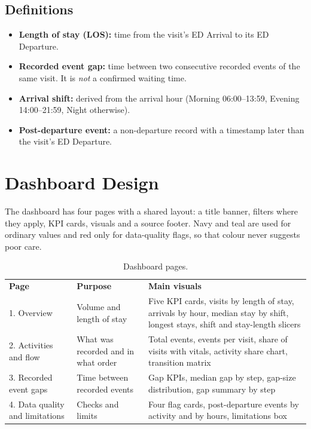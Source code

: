 \documentclass[11pt,a4paper]{article}
\newcommand{\tablehead}[1]{\color{white}\sffamily\bfseries #1}
\begin{document}
\subsection{Definitions}
\begin{itemize}
  \item \textbf{Length of stay (LOS):} time from the visit's ED Arrival to its ED Departure.
  \item \textbf{Recorded event gap:} time between two consecutive recorded events of the same visit. It is \emph{not} a confirmed waiting time.
  \item \textbf{Arrival shift:} derived from the arrival hour (Morning 06:00--13:59, Evening 14:00--21:59, Night otherwise).
  \item \textbf{Post-departure event:} a non-departure record with a timestamp later than the visit's ED Departure.
\end{itemize}

\section{Dashboard Design}
The dashboard has four pages with a shared layout: a title banner, filters where they apply, KPI cards, visuals and a source footer. Navy and teal are used for ordinary values and red only for data-quality flags, so that colour never suggests poor care.

\begin{table}[H]
\centering
\begin{tabularx}{\textwidth}{L{3.5cm}L{4cm}Y}
\tablehead{Page} & \tablehead{Purpose} & \tablehead{Main visuals}\\
1. Overview & Volume and length of stay & Five KPI cards, visits by length of stay, arrivals by hour, median stay by shift, longest stays, shift and stay-length slicers\\
2. Activities and flow & What was recorded and in what order & Total events, events per visit, share of visits with vitals, activity share chart, transition matrix\\
3. Recorded event gaps & Time between recorded events & Gap KPIs, median gap by step, gap-size distribution, gap summary by step\\
4. Data quality and limitations & Checks and limits & Four flag cards, post-departure events by activity and by hours, limitations box\\
\end{tabularx}
\caption{Dashboard pages.}
\end{table}
\end{document}
